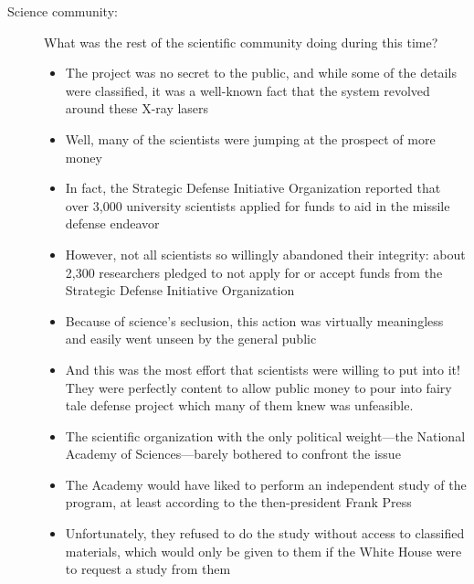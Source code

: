 \documentclass[12pt]{article}
\begin{document}
\begin{description}
\begin{description}
      \item[Science community:] What was the rest of the scientific community
        doing during this time?
        \begin{itemize}

          \item The project was no secret to the public, and while some of the
            details were classified, it was a well-known fact that the system
            revolved around these X-ray lasers

          \item Well, many of the scientists were jumping at the prospect of
            more money

          \item In fact, the Strategic Defense Initiative Organization reported
            that over 3,000 university scientists applied for funds to aid in
            the missile defense endeavor

          \item However, not all scientists so willingly abandoned their
            integrity: about 2,300 researchers pledged to not apply for or
            accept funds from the Strategic Defense Initiative Organization

          \item Because of science's seclusion, this action was virtually
            meaningless and easily went unseen by the general public

          \item And this was the most effort that scientists were willing to
            put into it! They were perfectly content to allow public money to
            pour into fairy tale defense project which many of them knew was
            unfeasible.

          \item The scientific organization with the only political
            weight---the National Academy of Sciences---barely bothered to
            confront the issue

          \item The Academy would have liked to perform an independent study of
            the program, at least according to the then-president Frank Press
            
          \item Unfortunately, they refused to do the study without access to
            classified materials, which would only be given to them if the
            White House were to request a study from them


\end{itemize}
\end{description}
\end{description}
\end{document}
